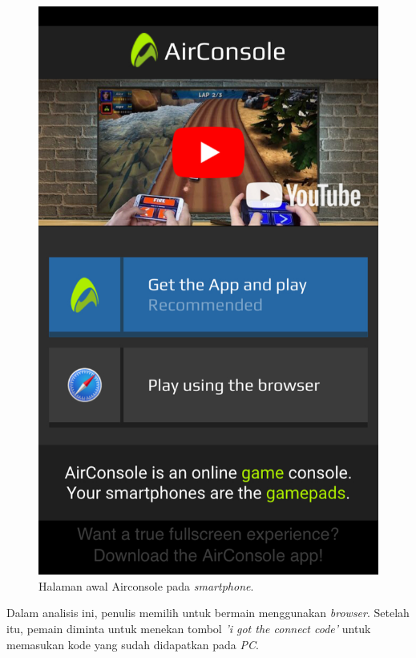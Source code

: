 \begin{figure}[H]
	\centering
	\includegraphics[scale=0.2]{Gambar/air1_home}
	\caption{Halaman awal Airconsole pada \textit{smartphone}.}
	\label{fig:18_air1_home}
\end{figure}


Dalam analisis ini, penulis memilih untuk bermain menggunakan \textit{browser}. Setelah itu, pemain diminta untuk menekan tombol \textit{'i got the connect code'} untuk memasukan kode yang sudah didapatkan pada \textit{PC}.

